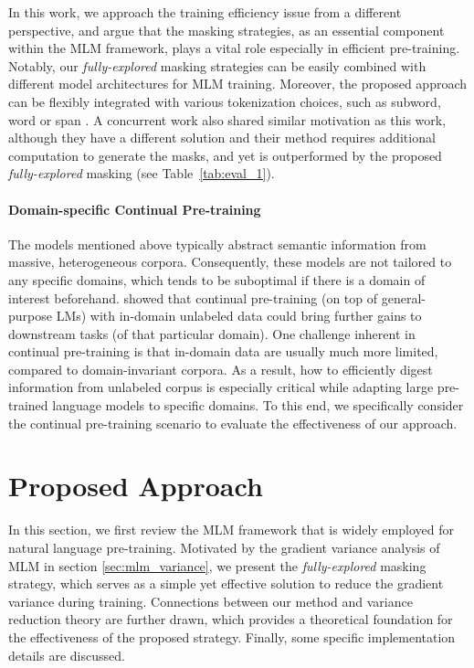 \documentclass{article} \usepackage{iclr2021_conference,times}
\theoremstyle{plain}
\begin{document}
In this work, we approach the training efficiency issue from a different perspective, and argue that the masking strategies, as an essential component within the MLM framework, plays a vital role especially in efficient pre-training. Notably, our \emph{fully-explored} masking strategies can be easily combined with different model architectures for MLM training. Moreover, the proposed approach can be flexibly integrated with various tokenization choices, such as subword, word or span \citep{joshi2019spanbert}. A concurrent work \citet{chen2020variance} also shared similar motivation as this work, although they have a different solution and their method requires additional computation to generate the masks, and yet is outperformed by the proposed \emph{fully-explored} masking (see Table~\ref{tab:eval_1}).
\vspace{-2mm}
\paragraph{Domain-specific Continual Pre-training}
The models mentioned above typically abstract semantic information from massive, heterogeneous corpora. Consequently, these models are not tailored to any specific domains, which tends to be suboptimal if there is a domain of interest beforehand. \citet{gururangan2020don} showed that continual pre-training (on top of general-purpose LMs) with in-domain unlabeled data could bring further gains to downstream tasks (of that particular domain).
One challenge inherent in continual pre-training is that in-domain data are usually much more limited, compared to domain-invariant corpora. As a result, how to efficiently digest information from unlabeled corpus is especially critical while adapting large pre-trained language models to specific domains. 
To this end, we specifically consider the continual pre-training scenario to evaluate the effectiveness of our approach. 

\vspace{-2mm}
\section{Proposed Approach}
\vspace{-3mm}
In this section, we first review the MLM framework that is widely employed for natural language pre-training. Motivated by the gradient variance analysis of MLM in section \ref{sec:mlm_variance}, we present the \emph{fully-explored} masking strategy, which serves as a simple yet effective solution to reduce the gradient variance during training. Connections between our method and variance reduction theory are further drawn, which provides a theoretical foundation for the effectiveness of the proposed strategy. Finally, some specific implementation details are discussed. 
\end{document}
